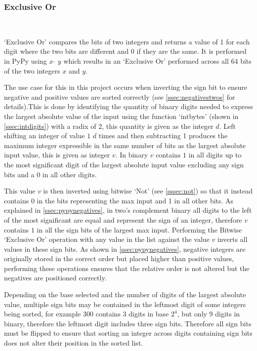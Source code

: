 \documentclass[12pt]{article}
\begin{document}
\subsubsection{Exclusive Or}\
\label{sssec:xor}
\par
`Exclusive Or' compares the bits of two integers and returns a value of 1 for each digit where the two bits are different and 0 if they are the same. It is performed in PyPy using $x$ $\hat{}$ $y$ which results in an `Exclusive Or' performed across all 64 bits of the two integers $x$ and $y$. 
\par
The use case for this in this project occurs when inverting the sign bit to ensure negative and positive values are sorted correctly (see \ref{ssec:negativestwos} for details).This is done by identifying the quantity of binary digits needed to express the largest absolute value of the input using the function `int\textunderscore bytes' (shown in \ref{ssec:intdigits}) with a radix of 2, this quantity is given as the integer $d$. Left shifting an integer of value $1$ $d$ times and then subtracting 1 produces the maximum integer expressible in the same number of bits as the largest absolute input value, this is given as integer $v$. In binary $v$ contains $1$ in all digits up to the most significant digit of the largest absolute input value excluding any sign bits and a 0 in all other digits.
\par
This value $v$ is then inverted using bitwise `Not' (see \ref{sssec:not}) so that it instead contains $0$ in the bits representing the max input and 1 in all other bits. As explained in \ref{ssec:pypynegatives}, in two's complement binary all digits to the left of the most significant are equal and represent the sign of an integer, therefore $v$ contains $1$ in all the sign bits of the largest max input. Performing the Bitwise `Exclusive Or' operation with any value in the list against the value $v$ inverts all values in these sign bits. As shown in \ref{ssec:pypynegatives}, negative integers are originally stored in the correct order but placed higher than positive values, performing these operations ensures that the relative order is not altered but the negatives are positioned correctly.
\par
Depending on the base selected and the number of digits of the largest absolute value, multiple sign bits may be contained in the leftmost digit of some integers being sorted, for example $300$ contains 3 digits in base $2^4$, but only 9 digits in binary, therefore the leftmost digit includes three sign bits. Therefore all sign bits must be flipped to ensure that sorting an integer across digits containing sign bits does not alter their position in the sorted list.
\end{document}
